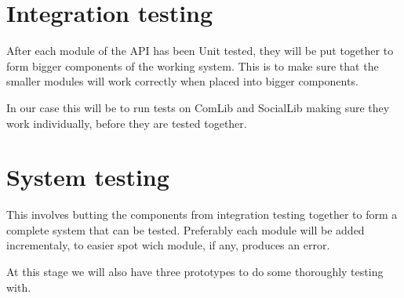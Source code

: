 \section{Integration testing}
After each module of the API has been Unit tested, they will be put together to form bigger components 
of the working system. This is to make sure that the smaller modules will work correctly when placed 
into bigger components. 

In our case this will be to run tests on ComLib and SocialLib making sure they work individually, 
before they are tested together.

\section{System testing}
This involves butting the components from integration testing together to form a complete system that 
can be tested. Preferably each module will be added incrementaly, to easier spot wich module, if any, 
produces an error.

At this stage we will also have three prototypes to do some thoroughly testing with.